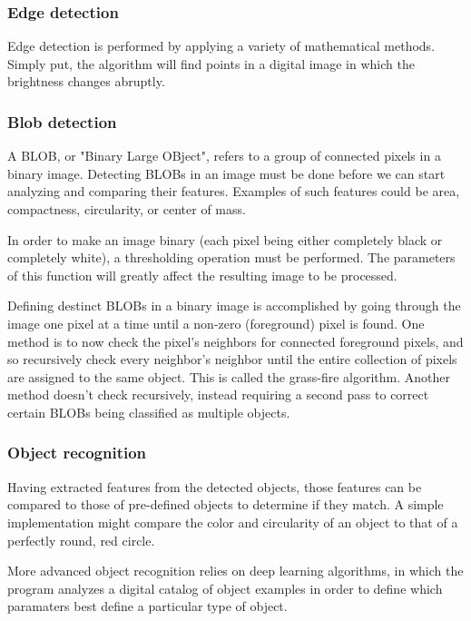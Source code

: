 			\subsubsection{Edge detection}
			
			Edge detection is performed by applying a variety of mathematical methods. Simply put, the algorithm will find points in a digital image in which the brightness changes abruptly. 
			
			\subsubsection{Blob detection}
			
			A BLOB, or "Binary Large OBject", refers to a group of connected pixels in a binary image. Detecting BLOBs in an image must be done before we can start analyzing and comparing their features. Examples of such features could be area, compactness, circularity, or center of mass.
			
			In order to make an image binary (each pixel being either completely black or completely white), a thresholding operation must be performed. The parameters of this function will greatly affect the resulting image to be processed. 
			
			Defining destinct BLOBs in a binary image is accomplished by going through the image one pixel at a time until a non-zero (foreground) pixel is found. One method is to now check the pixel's neighbors for connected foreground pixels, and so recursively check every neighbor's neighbor until the entire collection of pixels are assigned to the same object. This is called the grass-fire algorithm. Another method doesn't check recursively, instead requiring a second pass to correct certain BLOBs being classified as multiple objects.
			
			
			\subsubsection{Object recognition}
				Having extracted features from the detected objects, those features can be compared to those of pre-defined objects to determine if they match. A simple implementation might compare the color and circularity of an object to that of a perfectly round, red circle. 
				
				More advanced object recognition relies on deep learning algorithms, in which the program analyzes a digital catalog of object examples in order to define which paramaters best define a particular type of object.
			
